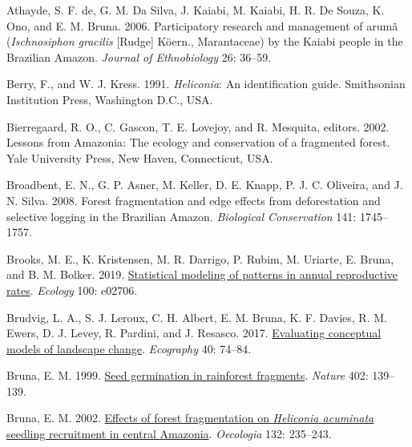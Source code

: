 \documentclass[
  man, donotrepeattitle,floatsintext]{apa6}
\newlength{\cslhangindent}
\newlength{\cslentryspacingunit} %
\newenvironment{CSLReferences}[2] %
 {%
  \setlength{\parindent}{0pt}
  \ifodd #1
  \let\oldpar\par
  \def\par{\hangindent=\cslhangindent\oldpar}
  \fi
  \setlength{\parskip}{#2\cslentryspacingunit}
 }%
 {}
\begin{document}
\hypertarget{refs}{}
\begin{CSLReferences}{1}{0}
\leavevmode{}%
Athayde, S. F. de, G. M. Da Silva, J. Kaiabi, M. Kaiabi, H. R. De Souza, K. Ono, and E. M. Bruna. 2006. Participatory research and management of arumã (\emph{{Ischnosiphon} gracilis} {[}{Rudge}{]} {Köern}., {Marantaceae}) by the {Kaiabi} people in the {Brazilian} {Amazon}. \emph{Journal of Ethnobiology} 26: 36--59.

\leavevmode{}%
Berry, F., and W. J. Kress. 1991. \emph{Heliconia}: An identification guide. Smithsonian Institution Press, Washington D.C., USA.

\leavevmode{}%
Bierregaard, R. O., C. Gascon, T. E. Lovejoy, and R. Mesquita, editors. 2002. Lessons from {Amazonia}: The ecology and conservation of a fragmented forest. Yale University Press, New Haven, Connecticut, USA.

\leavevmode{}%
Broadbent, E. N., G. P. Asner, M. Keller, D. E. Knapp, P. J. C. Oliveira, and J. N. Silva. 2008. Forest fragmentation and edge effects from deforestation and selective logging in the {Brazilian} {Amazon}. \emph{Biological Conservation} 141: 1745--1757.

\leavevmode{}%
Brooks, M. E., K. Kristensen, M. R. Darrigo, P. Rubim, M. Uriarte, E. Bruna, and B. M. Bolker. 2019. \href{https://doi.org/10.1002/ecy.2706}{Statistical modeling of patterns in annual reproductive rates}. \emph{Ecology} 100: e02706.

\leavevmode{}%
Brudvig, L. A., S. J. Leroux, C. H. Albert, E. M. Bruna, K. F. Davies, R. M. Ewers, D. J. Levey, R. Pardini, and J. Resasco. 2017. \href{https://doi.org/10.1111/ecog.02543}{Evaluating conceptual models of landscape change}. \emph{Ecography} 40: 74--84.

\leavevmode{}%
Bruna, E. M. 1999. \href{https://doi.org/10.1038/45963}{Seed germination in rainforest fragments}. \emph{Nature} 402: 139--139.

\leavevmode{}%
Bruna, E. M. 2002. \href{https://doi.org/10.1007/s00442-002-0956-y}{Effects of forest fragmentation on \emph{{Heliconia} acuminata} seedling recruitment in central {Amazonia}}. \emph{Oecologia} 132: 235--243.


\end{CSLReferences}
\end{document}

